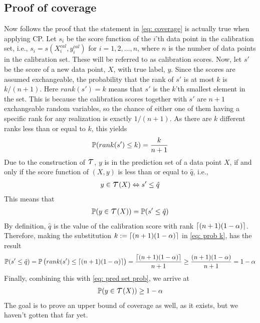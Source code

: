 \subsection*{Proof of coverage}
Now follows the proof that the statement in \cref{eq: coverage} is actually true when applying CP. Let $s_i$ be the score function of the $i$'th data point in the calibration set, i.e., $s_i=s(X_i^{cal},y_i^{cal})$ for $i=1,2,\dots,n$, where $n$ is the number of data points in the calibration set. These will be referred to as calibration scores.
Now, let $s'$ be the score of a new data point, $X$, with true label, $y$. Since the scores are assumed exchangeable, the probability that the rank of $s'$ is at most $k$ is $k/(n+1)$. Here $rank(s')=k$ means that $s'$ is the $k$'th smallest element in the set. This is because the calibration scores together with $s'$ are $n+1$ exchangeable random variables, so the chance of either one of them having a specific rank for any realization is exactly $1/(n+1)$. As there are $k$ different ranks less than or equal to $k$, this yields
\begin{gather}
    \operatorname*{\mathbb{P}}(rank(s')\leq k) = \frac{k}{n+1}
    \label{eq: prob k}
\end{gather}
Due to the construction of $\Tau$, $y$ is in the prediction set of a data point $X$, if and only if the score function of $(X,y)$ is less than or equal to $\hat q$, i.e., 
\begin{gather*}
    y\in\Tau(X) \Leftrightarrow s' \leq \hat q
\end{gather*}
This means that
\begin{gather}
    \doubleP(y\in\Tau(X)) = \doubleP(s' \leq \hat q)
    \label{eq: pred set prob}
\end{gather}
By definition, $\hat q$ is the value of the calibration score with rank $\lceil {(n+1)(1-\alpha)} \rceil$. Therefore, making the substitution $k := \lceil {(n+1)(1-\alpha)} \rceil$ in \cref{eq: prob k}, has the result
\begin{gather*}
    \operatorname*{\mathbb{P}}(s'\leq \hat q)
    = \operatorname*{\mathbb{P}}\big(rank(s') \leq \lceil {(n+1)(1-\alpha)} \rceil\big)
    = \frac{\lceil {(n+1)(1-\alpha)} \rceil}{n+1}
    \geq \frac{(n+1)(1-\alpha)}{n+1}
    = 1-\alpha
\end{gather*}
Finally, combining this with \cref{eq: pred set prob}, we arrive at
\begin{gather}
    \doubleP(y\in\Tau(X)) \geq 1-\alpha
\end{gather}
The goal is to prove an upper bound of coverage as well, as it exists, but we haven't gotten that far yet.
%
%
%
%
%
%
%
%
